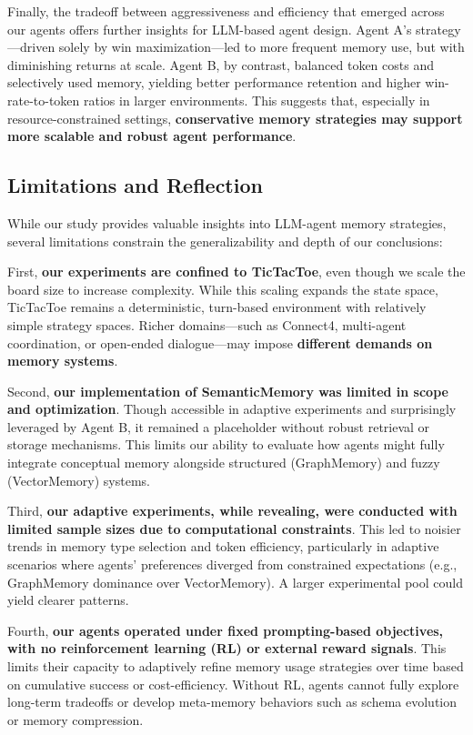 \documentclass[10pt]{article}
\begin{document}
Finally, the tradeoff between aggressiveness and efficiency that emerged across our agents offers further insights for LLM-based agent design. Agent A's strategy—driven solely by win maximization—led to more frequent memory use, but with diminishing returns at scale. Agent B, by contrast, balanced token costs and selectively used memory, yielding better performance retention and higher win-rate-to-token ratios in larger environments. This suggests that, especially in resource-constrained settings, \textbf{conservative memory strategies may support more scalable and robust agent performance}.

\subsection{Limitations and Reflection}

While our study provides valuable insights into LLM-agent memory strategies, several limitations constrain the generalizability and depth of our conclusions:

First, \textbf{our experiments are confined to TicTacToe}, even though we scale the board size to increase complexity. While this scaling expands the state space, TicTacToe remains a deterministic, turn-based environment with relatively simple strategy spaces. Richer domains—such as Connect4, multi-agent coordination, or open-ended dialogue—may impose \textbf{different demands on memory systems}.

Second, \textbf{our implementation of SemanticMemory was limited in scope and optimization}. Though accessible in adaptive experiments and surprisingly leveraged by Agent B, it remained a placeholder without robust retrieval or storage mechanisms. This limits our ability to evaluate how agents might fully integrate conceptual memory alongside structured (GraphMemory) and fuzzy (VectorMemory) systems.

Third, \textbf{our adaptive experiments, while revealing, were conducted with limited sample sizes due to computational constraints}. This led to noisier trends in memory type selection and token efficiency, particularly in adaptive scenarios where agents' preferences diverged from constrained expectations (e.g., GraphMemory dominance over VectorMemory). A larger experimental pool could yield clearer patterns.

Fourth, \textbf{our agents operated under fixed prompting-based objectives, with no reinforcement learning (RL) or external reward signals}. This limits their capacity to adaptively refine memory usage strategies over time based on cumulative success or cost-efficiency. Without RL, agents cannot fully explore long-term tradeoffs or develop meta-memory behaviors such as schema evolution or memory compression.
\end{document}
